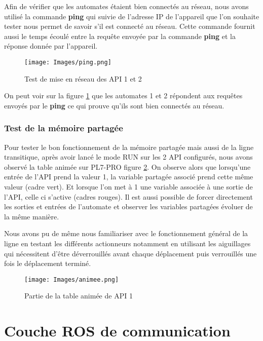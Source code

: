 \documentclass[a4paper,french, titlepage]{book}
\begin{document}
Afin de vérifier que les automates étaient bien connectés au réseau, nous avons utilisé la commande \textbf{ping} qui suivie de l'adresse IP de l'appareil que l'on souhaite tester nous permet de savoir s'il est connecté au réseau. Cette commande fournit aussi le temps écoulé entre la requête envoyée par la commande \textbf{ping} et la réponse donnée par l'appareil.

\begin{figure}[H] 
\begin{center}
\texttt{[image: Images/ping.png]} 
\end{center}
\caption{Test de mise en réseau des API 1 et 2}
\label{ping}
\end{figure}

On peut voir sur la figure \ref{ping} que les automates 1 et 2 répondent aux requêtes envoyés par le \textbf{ping} ce qui prouve qu'ils sont bien connectés au réseau.

\subsubsection{Test de la mémoire partagée}

Pour tester le bon fonctionnement de la mémoire partagée mais aussi de la ligne transitique, après avoir lancé le mode RUN sur les 2 API configurés, nous avons observé la table animée sur PL7-PRO figure  \ref{animee}. On observe alors que lorsqu'une entrée de l'API prend la valeur 1, la variable partagée associé prend cette même valeur (cadre vert). Et lorsque l'on met à 1 une variable associée à une sortie de l'API, celle ci s'active (cadres rouges). Il est aussi possible de forcer directement les sorties et entrées de l'automate et observer les variables partagées évoluer de la même manière.

Nous avons pu de même nous familiariser avec le fonctionnement général de la ligne en testant les différents actionneurs notamment en utilisant les aiguillages qui nécessitent d'être déverrouillés avant chaque déplacement puis verrouillés une fois le déplacement terminé.

\begin{figure}[H] 
\begin{center}
\texttt{[image: Images/animee.png]} 
\end{center}
\caption{Partie de la table animée de API 1}
\label{animee}
\end{figure}

\newpage
\section{Couche ROS de communication}
\end{document}
